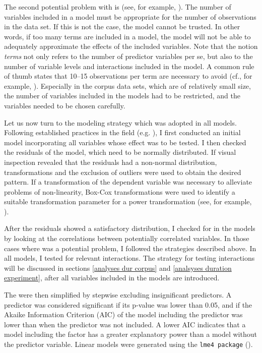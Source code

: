  The second potential problem with  is  (see, for example, \citealt{Draper.1998,Babyak.2004}). The number of variables included in a model must be appropriate for the number of observations in the data set. If this is not the case, the model cannot be trusted. In other words, if too many terms are included in a model, the model will not be able to adequately approximate the effects of the included variables. Note that the notion \textit{terms} not only refers to the number of predictor variables per se, but also to the number of variable levels and interactions included in the model.  A common rule of thumb states that 10--15 observations per term are necessary to avoid  (cf., for example, \citealt{Draper.1998}). Especially in the corpus data sets, which are of relatively small size, the number of variables included in the models had to be restricted, and the variables needed to be chosen carefully. 
 
Let us now turn to the modeling strategy which was adopted in all models. Following established practices in the field (e.g. \citealt{Baayen.2008}), I first conducted an initial model incorporating all variables whose effect was to be tested. I then checked the residuals of the model, which need to be normally distributed. If visual inspection revealed that the residuals had a non-normal distribution, transformations  and the exclusion of outliers were used to obtain the desired pattern. If a transformation of the dependent variable was necessary to alleviate problems of non-linearity, Box-Cox transformations were used to identify a suitable transformation parameter for a power transformation (see, for example, \citealt{Box.1964, Venables.2011}).

After the residuals showed a satisfactory distribution, I checked for  in the models by looking at the correlations between potentially correlated variables. In those cases where  was a potential problem, I followed the strategies described above.  In all models, I tested for relevant interactions. The strategy for testing interactions will be discussed in sections \ref{analyses dur corpus} and \ref{analsyses duration experiment}, after all variables included in the models are introduced.

The  were then simplified by stepwise excluding insignificant predictors. A predictor was considered significant if its p-value was lower than 0.05, and if the Akaike Information Criterion (AIC) of the model including the predictor was lower than when the predictor was not included. A lower AIC indicates that a model including the factor has a greater explanatory power than a model without the predictor variable. Linear models were generated using the \texttt{lme4 package} (\citealt{Bates.2014}).

